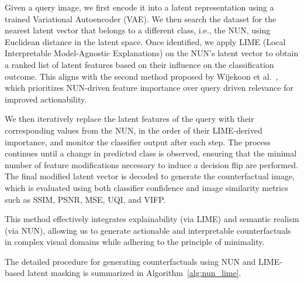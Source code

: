 Given a query image, we first encode it into a latent representation using a trained Variational Autoencoder (VAE). We then search the dataset for the nearest latent vector that belongs to a different class, i.e., the NUN, using Euclidean distance in the latent space. Once identified, we apply LIME (Local Interpretable Model-Agnostic Explanations) on the NUN’s latent vector to obtain a ranked list of latent features based on their influence on the classification outcome. This aligns with the second method proposed by Wijekoon et al.~\cite{WijekoonWNMPC21}, which prioritizes NUN-driven feature importance over query driven relevance for improved actionability.

We then iteratively replace the latent features of the query with their corresponding values from the NUN, in the order of their LIME-derived importance, and monitor the classifier output after each step. The process continues until a change in predicted class is observed, ensuring that the minimal number of feature modifications necessary to induce a decision flip are performed. The final modified latent vector is decoded to generate the counterfactual image, which is evaluated using both classifier confidence and image similarity metrics such as SSIM, PSNR, MSE, UQI, and VIFP.

This method effectively integrates explainability (via LIME) and semantic realism (via NUN), allowing us to generate actionable and interpretable counterfactuals in complex visual domains while adhering to the principle of minimality.

The detailed procedure for generating counterfactuals using NUN and LIME-based latent masking is summarized in Algorithm~\ref{alg:nun_lime}.


